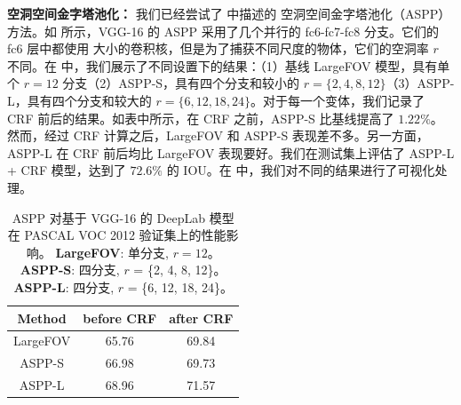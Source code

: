 \textbf{空洞空间金字塔池化：} 我们已经尝试了  中描述的 空洞空间金字塔池化（ASPP）方法。如  所示，VGG-16 的 ASPP 采用了几个并行的 fc6-fc7-fc8 分支。它们的 fc6 层中都使用  大小的卷积核，但是为了捕获不同尺度的物体，它们的空洞率 $r$ 不同。在  中，我们展示了不同设置下的结果：（1）基线 LargeFOV 模型，具有单个 $r=12$ 分支（2）ASPP-S，具有四个分支和较小的 $r=\{2,4,8,12\}$（3）ASPP-L，具有四个分支和较大的 $r=\{6,12,18,24\}$。对于每一个变体，我们记录了 CRF 前后的结果。如表中所示，在 CRF 之前，ASPP-S 比基线提高了 $1.22\%$。然而，经过 CRF 计算之后，LargeFOV 和 ASPP-S 表现差不多。另一方面，ASPP-L 在 CRF 前后均比 LargeFOV 表现要好。我们在测试集上评估了 ASPP-L + CRF 模型，达到了 $72.6\%$ 的 IOU。在  中，我们对不同的结果进行了可视化处理。

\begin{table}[!t]
  \centering
  \addtolength{\tabcolsep}{0pt}
  \begin{tabular} {c | c c }
    \toprule[0.2em]
    {\bf Method} & {\bf before CRF} & {\bf after CRF} \\
    \toprule[0.2em]
    LargeFOV & 65.76 & 69.84 \\
    ASPP-S   & 66.98 & 69.73 \\
    ASPP-L   & 68.96 & 71.57 \\
    \bottomrule[0.1em]
  \end{tabular}
  \caption{ASPP 对基于 VGG-16 的 DeepLab 模型在 PASCAL VOC 2012 验证集上的性能影响。
    {\bf LargeFOV}: 单分支, $r = 12$。
    {\bf ASPP-S}: 四分支, $r$ = \{2, 4, 8, 12\}。
    {\bf ASPP-L}: 四分支, $r$ = \{6, 12, 18, 24\}。}
  \label{tab:vgg_mfov}
\end{table}

